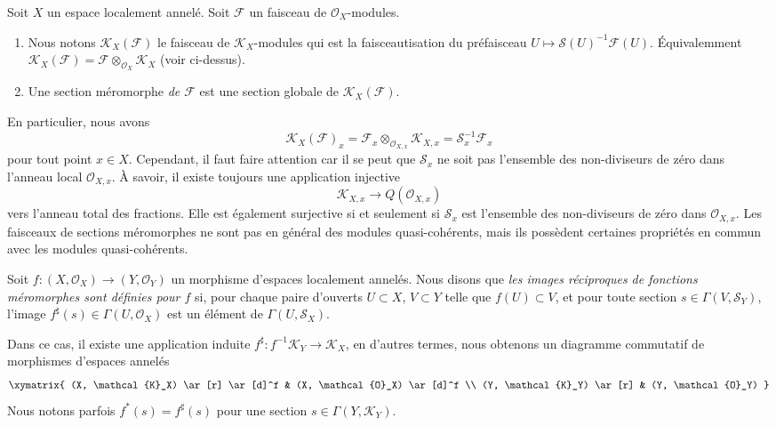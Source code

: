 \begin{definition}
\label{definition-meromorphic-section}
Soit  $X$  un espace localement annelé. Soit  $\mathcal{F}$  un faisceau de
 $\mathcal{O}_X$-modules.
\begin{enumerate}
\item Nous notons  $\mathcal{K}_X(\mathcal{F})$  le faisceau de  $\mathcal{K}_X$-modules qui est la
faisceautisation du préfaisceau  $U \mapsto \mathcal{S}(U)^{-1}\mathcal{F}(U)$. Équivalemment  $\mathcal{K}_X(\mathcal{F}) =
\mathcal{F} \otimes_{\mathcal{O}_X} \mathcal{K}_X$  (voir
ci-dessus).
\item Une section méromorphe  {\it  de  $\mathcal{F}$}  est
une section globale de  $\mathcal{K}_X(\mathcal{F})$.
\end{enumerate}
\end{definition}

\noindent
En particulier, nous avons
$$
\mathcal{K}_X(\mathcal{F})_x
=
\mathcal{F}_x \otimes_{\mathcal{O}_{X, x}} \mathcal{K}_{X, x}
=
\mathcal{S}_x^{-1}\mathcal{F}_x
$$
pour tout point  $x \in X$. Cependant, il faut faire attention car il se peut
 que  $\mathcal{S}_x$  ne soit pas l'ensemble des non-diviseurs de zéro dans l'anneau local
 $\mathcal{O}_{X, x}$. À savoir, il existe toujours une application injective
$$
\mathcal{K}_{X, x} \longrightarrow Q(\mathcal{O}_{X, x})
$$
vers l'anneau total des fractions. Elle est également surjective si et seulement si
 $\mathcal{S}_x$  est l'ensemble des non-diviseurs de zéro dans  $\mathcal{O}_{X, x}$. Les
faisceaux de sections méromorphes ne sont pas en général des modules
quasi-cohérents, mais ils possèdent certaines propriétés en commun avec les
modules quasi-cohérents.

\begin{definition}
\label{definition-pullback-meromorphic-sections}
Soit  $f : (X, \mathcal{O}_X) \to (Y, \mathcal{O}_Y)$  un morphisme d'espaces localement annelés. Nous disons que
 {\it  les images réciproques de fonctions méromorphes sont
définies pour  $f$}  si, pour chaque paire d'ouverts
 $U \subset X$,  $V \subset Y$  telle que  $f(U) \subset V$, et pour toute section
 $s \in \Gamma(V, \mathcal{S}_Y)$, l'image  $f^\sharp(s) \in \Gamma(U, \mathcal{O}_X)$  est un élément de  $\Gamma(U, \mathcal{S}_X)$.
\end{definition}

\noindent
Dans ce cas, il existe une application induite  $f^\sharp : f^{-1}\mathcal{K}_Y \to \mathcal{K}_X$, en d'autres termes,
nous obtenons un diagramme commutatif de morphismes d'espaces annelés
$$
\xymatrix{
(X, \mathcal{K}_X) \ar[r] \ar[d]^f &
(X, \mathcal{O}_X) \ar[d]^f \\
(Y, \mathcal{K}_Y) \ar[r] &
(Y, \mathcal{O}_Y)
}
$$
Nous notons parfois  $f^*(s) = f^\sharp(s)$  pour une section  $s \in \Gamma(Y, \mathcal{K}_Y)$.

